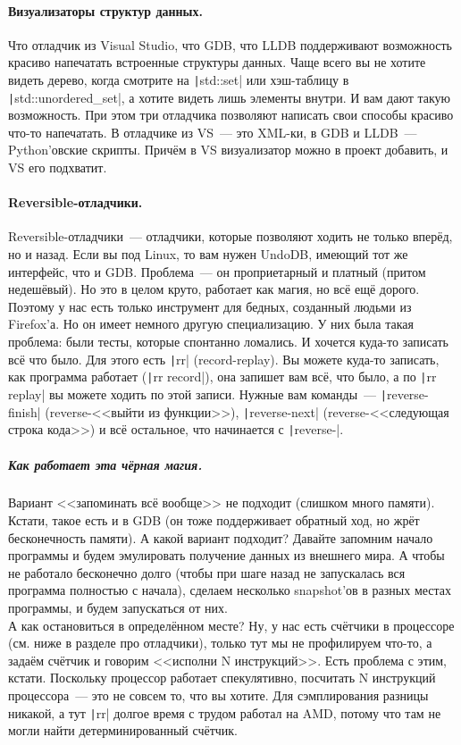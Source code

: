 \documentclass{article}
\begin{document}
    \paragraph{Визуализаторы структур данных.}
    Что отладчик из Visual Studio, что GDB, что LLDB поддерживают возможность красиво напечатать встроенные структуры данных. Чаще всего вы не хотите видеть дерево, когда смотрите на \texttt|std::set| или хэш-таблицу в \texttt|std::unordered_set|, а хотите видеть лишь элементы внутри. И вам дают такую возможность. При этом три отладчика позволяют написать свои способы красиво что-то напечатать. В отладчике из VS~--- это XML-ки, в GDB и LLDB~--- Python'овские скрипты. Причём в VS визуализатор можно в проект добавить, и VS его подхватит.
    \paragraph{Reversible-отладчики.}
    Reversible-отладчики~--- отладчики, которые позволяют ходить не только вперёд, но и назад. Если вы под Linux, то вам нужен UndoDB, имеющий тот же интерфейс, что и GDB. Проблема~--- он проприетарный и платный (притом недешёвый). Но это в целом круто, работает как магия, но всё ещё дорого. Поэтому у нас есть только инструмент для бедных, созданный людьми из Firefox'а. Но он имеет немного другую специализацию. У них была такая проблема: были тесты, которые спонтанно ломались. И хочется куда-то записать всё что было. Для этого есть \texttt|rr| (record-replay). Вы можете куда-то записать, как программа работает (\texttt|rr record|), она запишет вам всё, что было, а по \texttt|rr replay| вы можете ходить по этой записи. Нужные вам команды~--- \texttt|reverse-finish| (reverse-<<выйти из функции>>), \texttt|reverse-next| (reverse-<<следующая строка кода>>) и всё остальное, что начинается с \texttt|reverse-|.
    \subparagraph{Как работает эта чёрная магия.}
    Вариант <<запоминать всё вообще>> не подходит (слишком много памяти). Кстати, такое есть и в GDB (он тоже поддерживает обратный ход, но жрёт бесконечность памяти). А какой вариант подходит? Давайте запомним начало программы и будем эмулировать получение данных из внешнего мира. А чтобы не работало бесконечно долго (чтобы при шаге назад не запускалась вся программа полностью с начала), сделаем несколько snapshot'ов в разных местах программы, и будем запускаться от них.\\
    А как остановиться в определённом месте? Ну, у нас есть счётчики в процессоре (см. ниже в разделе про отладчики), только тут мы не профилируем что-то, а задаём счётчик и говорим <<исполни N инструкций>>. Есть проблема с этим, кстати. Поскольку процессор работает спекулятивно, посчитать N инструкций процессора~--- это не совсем то, что вы хотите. Для сэмплирования разницы никакой, а тут \texttt|rr| долгое время с трудом работал на AMD, потому что там не могли найти детерминированный счётчик.\\
\end{document}
